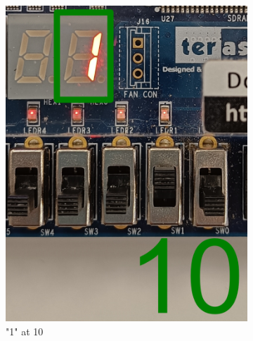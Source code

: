 \documentclass{article}
\begin{document}
\begin{figure}[h]
\begin{subfigure}{0.4\textwidth}
        \includegraphics[width=1\textwidth]{Figures/Part4-10.png}
        \caption{"1" at 10}
        \label{fig:T04pic3}
    \end{subfigure}
    \hfill
    \begin{subfigure}{0.4\textwidth}
        \centering

\end{subfigure}
\end{figure}
\end{document}
